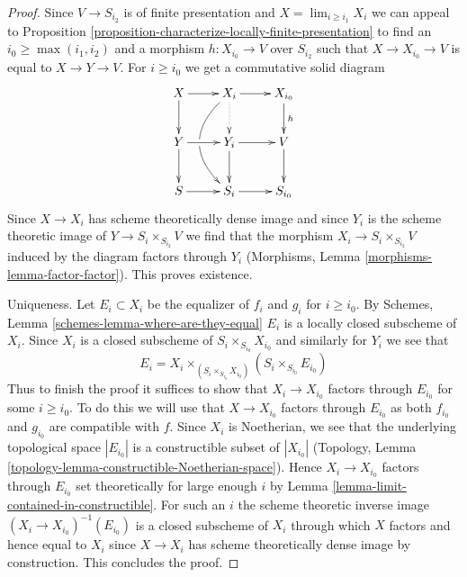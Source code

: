 \documentclass{stacks-project}
\theoremstyle{plain}
\theoremstyle{definition}
\theoremstyle{remark}
\numberwithin{equation}{subsection}
\def\lim{\mathop{\mathrm{lim}}\nolimits}
\begin{document}
\begin{proof}
Since $V \to S_{i_2}$ is of finite presentation and
$X = \lim_{i \geq i_1} X_i$ we can appeal to Proposition
\ref{proposition-characterize-locally-finite-presentation}
to find an $i_0 \geq \max(i_1, i_2)$ and a morphism $h : X_{i_0} \to V$
over $S_{i_2}$ such that $X \to X_{i_0} \to V$ is equal to $X \to Y \to V$.
For $i \geq i_0$ we get a commutative solid diagram
$$
\xymatrix{
X \ar[d] \ar[r] &
X_i \ar[r] \ar@{..>}[d] \ar@/_2pc/[dd] |!{[d];[ld]}\hole &
X_{i_0} \ar[d]^h \\
Y \ar[r] \ar[d] & Y_i \ar[r] \ar[d] & V \ar[d] \\
S \ar[r] & S_i \ar[r] & S_{i_0}
}
$$
Since $X \to X_i$ has scheme theoretically dense image
and since $Y_i$ is the scheme theoretic image of
$Y \to S_i \times_{S_{i_2}} V$
we find that the morphism $X_i \to S_i \times_{S_{i_2}} V$
induced by the diagram
factors through $Y_i$ (Morphisms, Lemma \ref{morphisms-lemma-factor-factor}).
This proves existence.

\medskip\noindent
Uniqueness. Let $E_i \subset X_i$ be the equalizer of $f_i$ and $g_i$
for $i \geq i_0$. By
Schemes, Lemma \ref{schemes-lemma-where-are-they-equal}
$E_i$ is a locally closed subscheme of $X_i$.
Since $X_i$ is a closed subscheme of $S_i \times_{S_{i_0}} X_{i_0}$
and similarly for $Y_i$ we see that
$$
E_i = X_i \times_{(S_i \times_{S_{i_0}} X_{i_0})} (S_i \times_{S_{i_0}} E_{i_0})
$$
Thus to finish the proof it suffices to show that $X_i \to X_{i_0}$
factors through $E_{i_0}$ for some $i \geq i_0$.
To do this we will use that $X \to X_{i_0}$ factors through $E_{i_0}$
as both $f_{i_0}$ and $g_{i_0}$ are compatible with $f$.
Since $X_i$ is Noetherian, we see that the underlying
topological space $|E_{i_0}|$ is a constructible subset of $|X_{i_0}|$
(Topology, Lemma \ref{topology-lemma-constructible-Noetherian-space}).
Hence $X_i \to X_{i_0}$ factors through $E_{i_0}$ set theoretically
for large enough $i$ by Lemma \ref{lemma-limit-contained-in-constructible}.
For such an $i$ the scheme theoretic inverse image
$(X_i \to X_{i_0})^{-1}(E_{i_0})$ is a closed subscheme of $X_i$
through which $X$ factors and hence equal to $X_i$ since
$X \to X_i$ has scheme theoretically dense image by construction.
This concludes the proof.
\end{proof}
\end{document}
